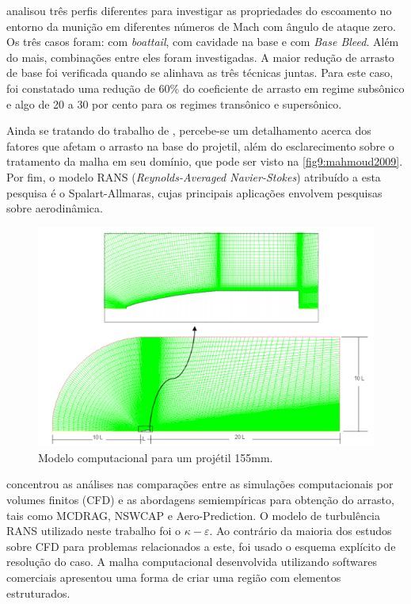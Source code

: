 \citeauthor{Mahmoud2009} analisou três perfis diferentes para investigar as propriedades do escoamento no entorno da munição em diferentes números de Mach com ângulo de ataque zero. Os três casos foram: com \textit{boattail}, com cavidade na base e com \textit{Base Bleed}. Além do mais, combinações entre eles foram investigadas. A maior redução de arrasto de base foi verificada quando se alinhava as três técnicas juntas. Para este caso, foi constatado uma redução de 60\% do coeficiente de arrasto em regime subsônico e algo de 20 a 30 por cento para os regimes transônico e supersônico. 
	
Ainda se tratando do trabalho de \citeauthor{Mahmoud2009}, percebe-se um detalhamento acerca dos fatores que afetam o arrasto na base do projetil, além do esclarecimento sobre o tratamento da malha em seu domínio, que pode ser visto na \autoref{fig9:mahmoud2009}. Por fim, o modelo RANS (\textit{Reynolds-Averaged Navier-Stokes}) atribuído a esta pesquisa é o Spalart-Allmaras, cujas principais aplicações envolvem pesquisas sobre aerodinâmica.  

\begin{figure}[!ht]
	\centering
	\includegraphics[width=1.0\textwidth]{foto09-malha-mahmoud2009.png}
	\caption[Modelo computacional para um projétil 155mm.]{Modelo computacional para um projétil 155mm. \cite{Mahmoud2009}}
	\label{fig9:mahmoud2009}
\end{figure}

\citeauthor{torangatti2basawaraj} concentrou as análises nas comparações entre as simulações computacionais por volumes finitos (CFD) e as abordagens semiempíricas para obtenção do arrasto, tais como MCDRAG, NSWCAP e Aero-Prediction. O modelo de turbulência RANS utilizado neste trabalho foi o $\kappa-\varepsilon$. Ao contrário da maioria dos estudos sobre CFD para problemas relacionados a este, foi usado o esquema explícito de resolução do caso. A malha computacional desenvolvida utilizando softwares comerciais apresentou uma forma de criar uma região com elementos estruturados.
	
